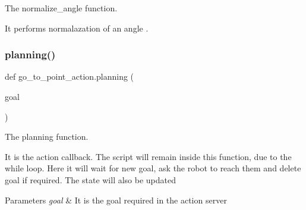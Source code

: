 The normalize\+\_\+angle function. 

It performs normalazation of an angle . \mbox{\label{namespacego__to__point__action_ab3bc8cf3239eaa0def69f3a87a98976c}} 
\subsubsection{\texorpdfstring{planning()}{planning()}}
{\footnotesize\ttfamily def go\+\_\+to\+\_\+point\+\_\+action.\+planning (\begin{DoxyParamCaption}\item[{}]{goal }\end{DoxyParamCaption})}



The planning function. 

It is the action callback. The script will remain inside this function, due to the while loop. Here it will wait for new goal, ask the robot to reach them and delete goal if required. The state will also be updated 
\begin{DoxyParams}{Parameters}
{\em goal} & It is the goal required in the action server \\
\hline
\end{DoxyParams}
